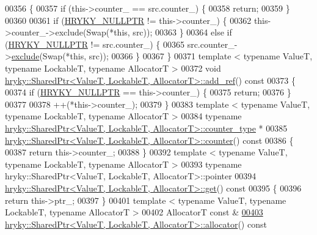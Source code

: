 \begin{DoxyCode}
00356 \{
00357     \textcolor{keywordflow}{if} (this->counter\_ == src.counter\_) \{
00358         \textcolor{keywordflow}{return};
00359     \}
00360 
00361     \textcolor{keywordflow}{if} (\hyperlink{common_8h_a4cd4ac09cfcdbd6b30ee69afc156e210}{HRYKY_NULLPTR} != this->counter\_) \{
00362         this->counter\_->exclude(Swap(*\textcolor{keyword}{this}, src));
00363     \}
00364     \textcolor{keywordflow}{else} \textcolor{keywordflow}{if} (\hyperlink{common_8h_a4cd4ac09cfcdbd6b30ee69afc156e210}{HRYKY_NULLPTR} != src.counter\_) \{
00365         src.counter\_->\hyperlink{group__atomic__operation_gae595f32af60a397c190c0d02fd5da565}{exclude}(Swap(*\textcolor{keyword}{this}, src));
00366     \}
00367 \}
00371 \textcolor{keyword}{template} < \textcolor{keyword}{typename} ValueT, \textcolor{keyword}{typename} LockableT, \textcolor{keyword}{typename} AllocatorT >
00372 \textcolor{keywordtype}{void} \hyperlink{classhryky_1_1_shared_ptr}{hryky::SharedPtr<ValueT, LockableT, AllocatorT>::add_ref}()\textcolor{keyword}{ const}
00373 \textcolor{keyword}{}\{
00374     \textcolor{keywordflow}{if} (\hyperlink{common_8h_a4cd4ac09cfcdbd6b30ee69afc156e210}{HRYKY_NULLPTR} == this->counter\_) \{
00375         \textcolor{keywordflow}{return};
00376     \}
00377 
00378     ++(*this->counter\_);
00379 \}
00383 \textcolor{keyword}{template} < \textcolor{keyword}{typename} ValueT, \textcolor{keyword}{typename} LockableT, \textcolor{keyword}{typename} AllocatorT >
00384 \textcolor{keyword}{typename} \hyperlink{classhryky_1_1atomic_1_1_writer}{hryky::SharedPtr<ValueT, LockableT, AllocatorT>::counter_type} * 
00385 \hyperlink{classhryky_1_1_shared_ptr}{hryky::SharedPtr<ValueT, LockableT, AllocatorT>::counter}()\textcolor{keyword}{ const}
00386 \textcolor{keyword}{}\{
00387     \textcolor{keywordflow}{return} this->counter\_;
00388 \}
00392 \textcolor{keyword}{template} < \textcolor{keyword}{typename} ValueT, \textcolor{keyword}{typename} LockableT, \textcolor{keyword}{typename} AllocatorT >
00393 \textcolor{keyword}{typename} hryky::SharedPtr<ValueT, LockableT, AllocatorT>::pointer 
00394 \hyperlink{namespacehryky_1_1log_1_1writer_a67d38d407be7aaf3cc9ed3ac8e3b2835}{hryky::SharedPtr<ValueT, LockableT, AllocatorT>::get}()\textcolor{keyword}{ const}
00395 \textcolor{keyword}{}\{
00396     \textcolor{keywordflow}{return} this->ptr\_;
00397 \}
00401 \textcolor{keyword}{template} < \textcolor{keyword}{typename} ValueT, \textcolor{keyword}{typename} LockableT, \textcolor{keyword}{typename} AllocatorT >
00402 AllocatorT \textcolor{keyword}{const} &
\hypertarget{shared__ptr_8h_source_l00403}{}\hyperlink{classhryky_1_1_shared_ptr_a6238460a4d882766f62458ad727f7bb4}{00403} \hyperlink{classhryky_1_1_shared_ptr}{hryky::SharedPtr<ValueT, LockableT, AllocatorT>::allocator}()\textcolor{keyword}{ const}

\end{DoxyCode}
